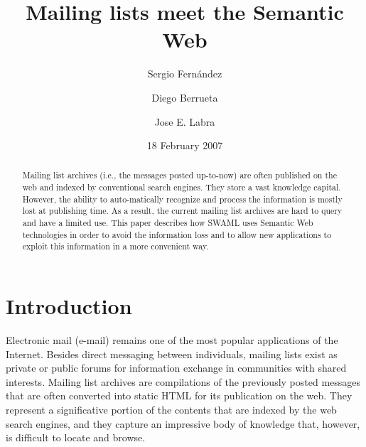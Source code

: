 \documentclass{llncs}
\begin{document}
\title{Mailing lists meet the Semantic Web}


\author{
Sergio Fern\'andez 
\and
Diego Berrueta 
\and
Jose E. Labra
}




\date{18 February 2007}

\maketitle

\begin{abstract}

Mailing list archives (i.e., the messages posted up-to-now) are often 
published on the web and indexed by conventional search engines. They 
store a vast knowledge capital. However, the ability to auto-matically 
recognize and process the information is mostly lost at publishing time. 
As a result, the current mailing list archives are hard to query and have 
a limited use. This paper describes how SWAML uses Semantic Web technologies 
in order to avoid the information loss and to allow new applications 
to exploit this information in a more convenient way.

\end{abstract}

\section{Introduction}

Electronic mail (e-mail) remains one of the most
popular applications of the Internet. Besides direct messaging
between individuals, mailing lists exist as private or public
forums for information exchange in communities with shared interests.
Mailing list archives are compilations of the previously posted
messages that are often converted into static HTML for its
publication on the web. They represent a significative portion of
the contents that are indexed by the web search engines, and they
capture an impressive body of knowledge that, however, is difficult
to locate and browse.
\end{document}
